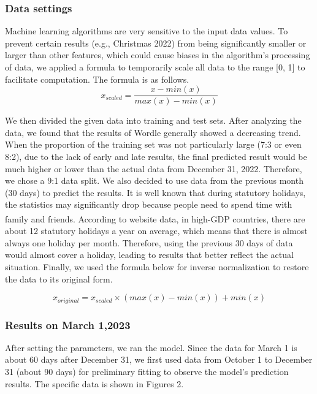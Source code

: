 \documentclass{mcmthesis}  %
\newcommand{\upcite}[1]{\textsuperscript{\cite{#1}}}
\begin{document}
\subsubsection{Data settings}
Machine learning algorithms are very sensitive to the input data values. To prevent certain results
 (e.g., Christmas 2022) from being significantly smaller or larger than other features, which 
 could cause biases in the algorithm's processing of data, we applied a formula to temporarily 
 scale all data to the range [0, 1] to facilitate computation. The formula is as follows.
 \begin{equation} 
        x_{scaled} =\frac{x-min(x)}{max(x)-min(x)} 
\end{equation} 

We then divided the given data into training and test sets. After analyzing the data, 
we found that the results of Wordle generally showed a decreasing trend. When the proportion of 
the training set was not particularly large (7:3 or even 8:2), due to the lack of early and late 
results, the final predicted result would be much higher or lower than the actual data from 
December 31, 2022. Therefore, we chose a 9:1 data split. We also decided to use data from the 
previous month (30 days) to predict the results. It is well known that during statutory holidays, 
the statistics may significantly drop because people need to spend time with family and friends. 
According to website data\upcite{1}, in high-GDP countries, there are about 12 statutory 
holidays a year on average, which means that there is almost always one holiday per month. Therefore, 
using the previous 30 days of data would almost cover a holiday, leading to results that better 
reflect the actual situation. Finally, we used the formula below for inverse normalization 
to restore the data to its original form.

\begin{equation} 
        x_{original} =x_{scaled}\times (max(x)-min(x))+min(x)
\end{equation}  

\subsubsection{Results on March 1,2023}
After setting the parameters, we ran the model. Since the data for March 1 is about 60 days after December 31, 
we first used data from October 1 to December 31 (about 90 days) for preliminary fitting to observe the model's 
prediction results. The specific data is shown in Figures 2. 
\end{document}
